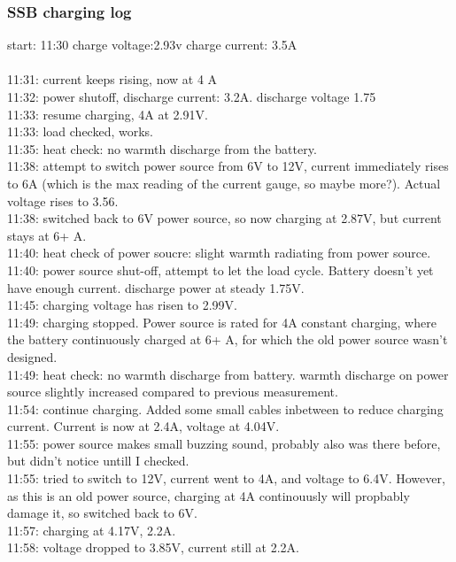 \subsubsection{\textbf{SSB charging log}}
start: 11:30
charge voltage:2.93v
charge current: 3.5A
\\\\
11:31: current keeps rising, now at 4 A\\
11:32: power shutoff, discharge current: 3.2A. discharge voltage 1.75\\
11:33: resume charging, 4A at 2.91V.\\
11:33: load checked, works.\\
11:35: heat check: no warmth discharge from the battery.\\
11:38: attempt to switch power source from 6V to 12V, current immediately rises to 6A (which is the max reading of the current gauge, so maybe more?). Actual voltage rises to 3.56.\\
11:38: switched back to 6V power source, so now charging at 2.87V, but current stays at 6+ A.\\
11:40: heat check of power soucre: slight warmth radiating from power source.\\
11:40: power source shut-off, attempt to let the load cycle. Battery doesn't yet have enough current. discharge power at steady 1.75V.\\
11:45: charging voltage has risen to 2.99V.\\
11:49: charging stopped. Power source is rated for 4A constant charging, where the battery continuously charged at 6+ A, for which the old power source wasn't designed.\\
11:49: heat check: no warmth discharge from battery. warmth discharge on power source slightly increased compared to previous measurement.\\
11:54: continue charging. Added some small cables inbetween to reduce charging current. Current is now at 2.4A, voltage at 4.04V.\\
11:55: power source makes small buzzing sound, probably also was there before, but didn't notice untill I checked.\\
11:55: tried to switch to 12V, current went to 4A, and voltage to 6.4V. However, as this is an old power source, charging at 4A continouusly will propbably damage it, so switched back to 6V.\\
11:57: charging at 4.17V, 2.2A.\\
11:58: voltage dropped to 3.85V, current still at 2.2A.\\
